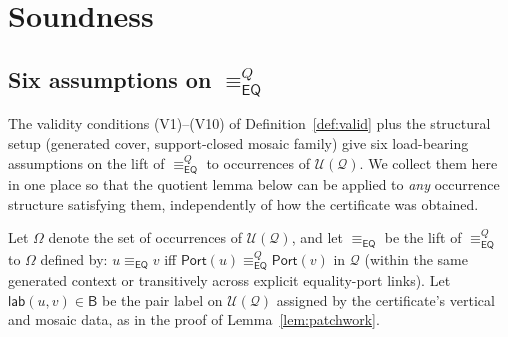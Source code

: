 \documentclass[11pt]{article}
\newcommand{\Base}{\mathsf{B}}
\newcommand{\EQ}{\mathsf{EQ}}
\newcommand{\Q}{\mathcal Q}
\newcommand{\U}{\mathcal U}
\newcommand{\Port}{\mathsf{Port}}
\newcommand{\eqc}{\equiv_{\EQ}}
\newcommand{\lab}{\mathsf{lab}}
\begin{document}
\section{Soundness}

\subsection{Six assumptions on \texorpdfstring{$\eqc^Q$}{the equality congruence}}
\label{ssec:six-assumptions}

The validity conditions (V1)--(V10) of Definition~\ref{def:valid}
plus the structural setup (generated cover, support-closed mosaic
family) give six load-bearing assumptions on the lift of $\eqc^Q$ to
occurrences of $\U(\Q)$.  We collect them here in one place so that
the quotient lemma below can be applied to \emph{any} occurrence
structure satisfying them, independently of how the certificate was
obtained.

Let $\Omega$ denote the set of occurrences of $\U(\Q)$, and let
$\eqc$ be the lift of $\eqc^Q$ to $\Omega$ defined by:
$u\eqc v$ iff $\Port(u)\eqc^Q\Port(v)$ in $\Q$ (within the same
generated context or transitively across explicit equality-port
links).  Let $\lab(u,v)\in\Base$ be the pair label on $\U(\Q)$
assigned by the certificate's vertical and mosaic data, as in the
proof of Lemma~\ref{lem:patchwork}.
\end{document}
